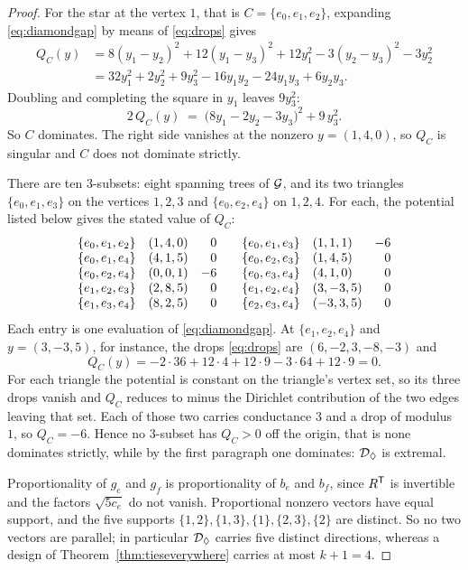 \begin{proof}
For the star at the vertex $1$, that is $C=\{e_0,e_1,e_2\}$, expanding
\eqref{eq:diamondgap} by means of \eqref{eq:drops} gives
\begin{align*}
  Q_C(y)&=8(y_1-y_2)^2+12(y_1-y_3)^2+12y_1^2-3(y_2-y_3)^2-3y_2^2\\
        &=32y_1^2+2y_2^2+9y_3^2-16y_1y_2-24y_1y_3+6y_2y_3 .
\end{align*}
Doubling and completing the square in $y_1$ leaves $9y_3^{2}$:
\begin{equation}\label{eq:diamondstar}
  2\,Q_C(y)\;=\;\bigl(8y_1-2y_2-3y_3\bigr)^{2}+9\,y_3^{2} .
\end{equation}
So $C$ dominates.  The right side vanishes at the nonzero $y=(1,4,0)$, so
$Q_C$ is singular and $C$ does not dominate strictly.

There are ten $3$-subsets: eight spanning trees of $\mathcal{G}$, and its two
triangles $\{e_0,e_1,e_3\}$ on the vertices $1,2,3$ and
$\{e_0,e_2,e_4\}$ on $1,2,4$.  For each, the potential listed below gives
the stated value of $Q_C$:
\[
\begin{array}{llr@{\qquad}llr}
\{e_0,e_1,e_2\} & (1,4,0)  & 0 &
\{e_0,e_1,e_3\} & (1,1,1)  & -6\\
\{e_0,e_1,e_4\} & (4,1,5)  & 0 &
\{e_0,e_2,e_3\} & (1,4,5)  & 0\\
\{e_0,e_2,e_4\} & (0,0,1)  & -6 &
\{e_0,e_3,e_4\} & (4,1,0)  & 0\\
\{e_1,e_2,e_3\} & (2,8,5)  & 0 &
\{e_1,e_2,e_4\} & (3,-3,5) & 0\\
\{e_1,e_3,e_4\} & (8,2,5)  & 0 &
\{e_2,e_3,e_4\} & (-3,3,5) & 0
\end{array}
\]
Each entry is one evaluation of \eqref{eq:diamondgap}.  At
$\{e_1,e_2,e_4\}$ and $y=(3,-3,5)$, for instance, the drops
\eqref{eq:drops} are $(6,-2,3,-8,-3)$ and
\[
  Q_C(y)=-2\cdot36+12\cdot4+12\cdot9-3\cdot64+12\cdot9=0 .
\]
For each triangle the potential is constant on the triangle's vertex set,
so its three drops vanish and $Q_C$ reduces to minus the Dirichlet
contribution of the two edges leaving that set.  Each of those two carries
conductance $3$ and a drop of modulus $1$, so $Q_C=-6$.  Hence no
$3$-subset has $Q_C>0$ off the origin, that is none dominates strictly,
while by the first paragraph one dominates: $\mathcal{D}_{\Diamond}$ is extremal.

Proportionality of $g_e$ and $g_f$ is proportionality of $b_e$ and $b_f$,
since $R^{\mathsf{T}}$ is invertible and the factors $\sqrt{5c_e}$ do not
vanish.  Proportional nonzero vectors have equal support, and the five
supports $\{1,2\},\{1,3\},\{1\},\{2,3\},\{2\}$ are distinct.  So no two
vectors are parallel; in particular $\mathcal{D}_{\Diamond}$ carries five distinct
directions, whereas a design of Theorem~\ref{thm:tieseverywhere} carries
at most $k+1=4$.
\end{proof}

